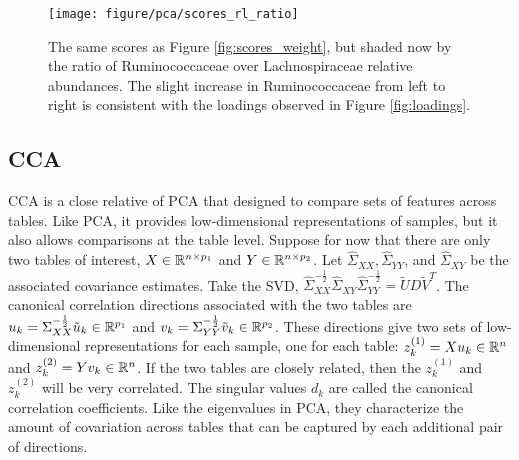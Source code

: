 \documentclass{article}
\begin{document}
\begin{figure}[ht]
  \centering
  \texttt{[image: figure/pca/scores\_rl\_ratio]}
  \caption{The same scores as Figure \ref{fig:scores_weight}, but shaded now by
    the ratio of Ruminococcaceae over Lachnospiraceae relative abundances. The
    slight increase in Ruminococcaceae from left to right is consistent with the
    loadings observed in Figure \ref{fig:loadings}.\label{fig:scores_rl_ratio} }
\end{figure}

\subsection{CCA}
\label{subsec:cca}

CCA is a close relative of PCA that designed to compare sets of features across
tables. Like PCA, it provides low-dimensional representations of samples, but it
also allows comparisons at the table level. Suppose for now that there are only
two tables of interest, $X \in \mathbb{R}^{n \times p_{1}}$ and $Y \in \mathbb{R}^{n
  \times p_{2}}$. Let $\hat{\Sigma}_{XX}, \hat{\Sigma}_{YY}$, and
$\hat{\Sigma}_{XY}$ be the associated covariance estimates. Take the SVD,
$\hat{\Sigma}_{XX}^{-\frac{1}{2}}\hat{\Sigma}_{XY}\hat{\Sigma}_{YY}^{-\frac{1}{2}}
= \tilde{U}D\tilde{V}^{T}$. The canonical correlation directions associated with
the two tables are $u_{k} = \Sigma_{XX}^{-\frac{1}{2}}\tilde{u}_{k} \in
\mathbb{R}^{p_{1}}$ and $v_{k} = \Sigma_{YY}^{-\frac{1}{2}}\tilde{v}_{k} \in
\mathbb{R}^{p_{2}}$. These directions give two sets of low-dimensional
representations for each sample, one for each table: $z_{k}^{(1)} = Xu_{k} \in
\mathbb{R}^{n}$ and $z_{k}^{(2)} = Yv_{k} \in \mathbb{R}^{n}$. If the two tables are
closely related, then the $z_{k}^{(1)}$ and $z_{k}^{(2)}$ will be very
correlated. The singular values $d_{k}$ are called the canonical correlation
coefficients. Like the eigenvalues in PCA, they characterize the amount of
covariation across tables that can be captured by each additional pair of
directions.
\end{document}
